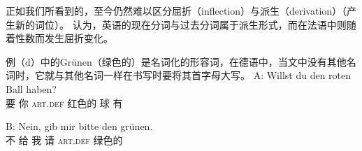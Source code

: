 
正如我们所看到的，至今仍然难以区分屈折（inflection）与派生（derivation）（产生新的词位）。 \citet*[--264]{SWB2003a}认为，英语的现在分词与过去分词属于派生形式，而在法语中则随着性数而发生屈折变化。

例（d）中的Grünen（绿色的）是名词化的形容词，在德语中，当文中没有其他名词时，它就与其他名词一样在书写时要将其首字母大写。
\ea
\gll A: Willst du den roten Ball haben?\\
	 {} 要 你 \textsc{art}.\textsc{def} 红色的 球 有\\
\glt {} 

\gll B: Nein, gib mir bitte den grünen.\\
	{} 不 给 我 请 \textsc{art}.\textsc{def} 绿色的\\
\glt {} 
\z

